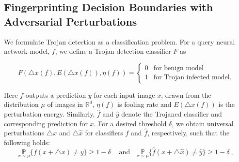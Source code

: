 \documentclass{article}
\begin{document}
\vspace{-2mm}
\subsection{Fingerprinting Decision Boundaries with Adversarial Perturbations}
\vspace{-2mm}







We formulate Trojan detection as a classification problem. For a query neural network model, $f$,  we define a  Trojan detection classifier $F$ as

\vspace{-3mm}
\begin{equation}\label{eq:tc}
F (\triangle x(f), E(\triangle x(f)), \eta(f)) = \left\{ \begin {array}{ll}
0 & \mbox{for benign model}\\
1 & \mbox {for Trojan infected model.}
\end {array}
\right.
\end {equation}
\vspace{-2mm}






 Here $f$ outputs a prediction $y$  for each input image $x$, drawn from the distribution $\mu$ of images in $\mathbb{R}^{d}$, $\eta(f)$ is fooling rate and $E(\triangle x(f))$ is the perturbation energy. Similarly, $\hat{f}$ and $\hat{y}$ denote the Trojaned classifier and corresponding prediction for $x$. For a desired threshold $\delta$, we  obtain universal perturbations $\triangle x$ and $\triangle \hat{x}$ for classifiers $f$ and $\hat{f}$, respectively, such that the following holds:
\begin{equation}\label{eq:cf1}
\underset{x \sim \mu}{\mathbb{P}}\{f(x +  \triangle x) \neq y \} \ge 1- \delta \ \quad \text{and} \quad
\underset{x \sim \mu}{\mathbb{P}}\{\hat{f}(x +  \triangle \hat{x}) \neq \hat{y}\} \ge 1-\delta \ ,\end{equation}
\end{document}
